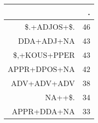 \begin{tabular}{rr}
  \hline
 & . \\ 
  \hline
\$.+ADJOS+\$. &  46 \\ 
  DDA+ADJ+NA &  43 \\ 
  \$,+KOUS+PPER &  43 \\ 
  APPR+DPOS+NA &  42 \\ 
  ADV+ADV+ADV &  38 \\ 
  NA++\$. &  34 \\ 
  APPR+DDA+NA &  33 \\ 
   \hline
\end{tabular}
